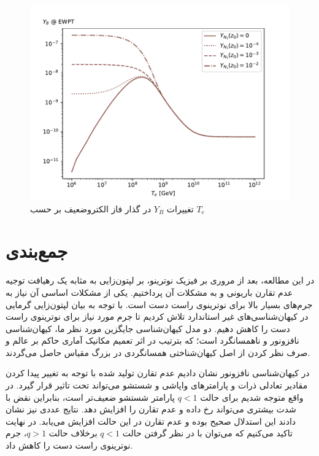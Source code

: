 \documentclass[a4paper]{book}
\begin{document}
\begin{figure}[b]
	\centering
	\includegraphics[width=13cm]{fig-B-anisotropic.pdf}
	\caption{تغییرات {\footnotesize$Y_{B}$} در گذار فاز الکتروضعیف بر حسب {\footnotesize$T_e$} \label{fig:YB-anisotropic}}
\end{figure}

\chapter{جمع‌بندی}
\label{chap:conclusion}
در این مطالعه، بعد از مروری بر فیزیک نوترینو، بر لپتون‌زایی به مثابه یک رهیافت توجیه عدم تقارن باریونی و به مشکلات آن پرداختیم. یکی از مشکلات اساسی آن نیاز به جرم‌های بسیار بالا برای نوترینوی راست دست است. با توجه به بیان لپتون‌زایی گرمایی در کیهان‌شناسی‌های غیر استاندارد تلاش کردیم تا جرم مورد نیاز برای نوترینوی راست دست را کاهش دهیم. دو مدل کیهان‌شناسی جایگزین مورد نظر ما، کیهان‌شناسی نافزونور و ناهمسانگرد است؛ که بترتیب در اثر تعمیم مکانیک آماری حاکم بر عالم و صرف نظر کردن از اصل کیهان‌شناختی همسانگردی در بزرگ مقیاس حاصل می‌گردند.

در کیهان‌شناسی نافزونور نشان دادیم عدم تقارن تولید شده با توجه به تغییر پیدا کردن مقادیر تعادلی ذرات و پارامترهای واپاشی و شستشو می‌تواند تحت تاثیر قرار گیرد. در واقع متوجه شدیم برای حالت {\footnotesize$q<1$} پارامتر شستشو ضعیف‌تر است، بنابراین نقض  با شدت بیشتری می‌تواند رخ داده و عدم تقارن را افزایش دهد. نتایج عددی نیز نشان دادند این استدلال صحیح بوده و عدم تقارن در این حالت افزایش می‌یابد. در نهایت تاکید می‌کنیم که می‌توان با در نظر گرفتن حالت {\footnotesize$q<1$} برخلاف حالت {\footnotesize$q>1$}، جرم نوترینوی راست دست را کاهش داد.
\end{document}
